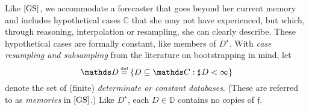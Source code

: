 \documentclass[12pt,a4paper,twoside]{article}
\newcommand{\gsii}{$\textup{[GS]}$}
\newcommand{\novel}{\mathfrak f}
\newcommand{\countof}{\mathbin{\sharp}\hskip1pt}
\newcommand{\mbbd}{{\mathds D}}
\newcommand{\mbbc}{{\mathds C}}
\newcommand{\past}{{D^\star}}
\newcommand{\lbc}{\left\{}
\newcommand{\rbc}{\right\}}
\begin{document}
Like \gsii, we accommodate a forecaster that goes beyond her current memory and
includes hypothetical cases
$\mbbc$ that she may not have experienced, but which, through reasoning,
interpolation or resampling, she can clearly describe. These hypothetical cases
are formally constant, like members of $\past$. 
% 
With \emph{case resampling and subsampling} from the literature on bootstrapping
in mind, let
\[\mbbd\defeq \lbc D\subseteq \mbbc: \countof D<\infty\rbc \] denote
the set of (finite) \emph{determinate or constant databases}.  (These are
referred to as \emph{memories} in \gsii.)  Like $\past$, each $D\in \mbbd $
contains no copies of $\novel$.
\end{document}
